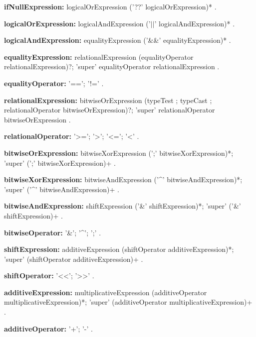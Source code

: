 \begin{grammar}
{\bf ifNullExpression:}
    logicalOrExpression ('??' logicalOrExpression)*
    .
\end{grammar}
\begin{grammar}
{\bf logicalOrExpression:}
    logicalAndExpression ('$||$' logicalAndExpression)*
    .

{\bf logicalAndExpression:}
    equalityExpression ('\&\&' equalityExpression)*
    .
 \end{grammar}
\begin{grammar}
{\bf equalityExpression:}
    relationalExpression (equalityOperator relationalExpression)?;
    'super' equalityOperator relationalExpression
    .

{\bf equalityOperator:}
    '==';
    '!='
    .
\end{grammar}
\begin{grammar}
{\bf relationalExpression:}
    bitwiseOrExpression (typeTest ; typeCast ; relationalOperator bitwiseOrExpression)?;
    'super' relationalOperator bitwiseOrExpression
    .

{\bf relationalOperator:}
    '>=';
    '>';
    '<=';
    '<'
    .
\end{grammar}
\begin{grammar}
{\bf bitwiseOrExpression:}
    bitwiseXorExpression (';' bitwiseXorExpression)*;
    'super' (';' bitwiseXorExpression)+
    .

{\bf bitwiseXorExpression:}
    bitwiseAndExpression ('\^{}' bitwiseAndExpression)*;
    'super' ('\^{}' bitwiseAndExpression)+
    .

{\bf bitwiseAndExpression:}
    shiftExpression ('\&' shiftExpression)*;
    'super' ('\&' shiftExpression)+
    .

{\bf bitwiseOperator:}
    '&';
    '^';
    ';'
    .
\end{grammar}
\begin{grammar}
{\bf shiftExpression:}
    additiveExpression (shiftOperator additiveExpression)*;
    'super' (shiftOperator additiveExpression)+
    .

{\bf shiftOperator:}
    '<<';
    '>>' 
    .
\end{grammar}
\begin{grammar}
{\bf additiveExpression:}
    multiplicativeExpression (additiveOperator multiplicativeExpression)*;
    'super' (additiveOperator multiplicativeExpression)+
    .

{\bf additiveOperator:}
    '+';
    '-'
    .
\end{grammar}
